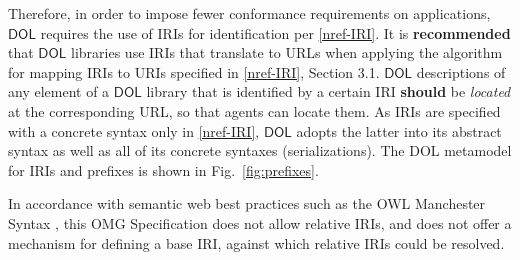 \documentclass[10pt, a4paper]{isov2}
\makeatletter
\newcommand*\CommentAuthor{}
\renewcommand*\CommentAuthor{#1}}
\newcommand*\CommentDate{}
\renewcommand*\CommentDate{#1}}
\newcommand*\CommentId{}
\renewcommand*\CommentId{#1}}
\newcommand*\CommentType{}
\renewcommand*\CommentType{#1}}
\newcommand*{\SetCommentColorByType}[1]{%
\edef\localType{{#1}}%
\expandafter\ifstrequal\localType{q-aut}{\colorlet{CommentColor}{red}}{%
\expandafter\ifstrequal\localType{q-all}{\colorlet{CommentColor}{orange}}{%
\expandafter\ifstrequal\localType{todo}{\colorlet{CommentColor}{orange}}{%
\expandafter\ifstrequal\localType{fyi}{\colorlet{CommentColor}{lightgray}}{%
\colorlet{CommentColor}{yellow}}}}}}
\newcommand*{\SetCommentPrefixByType}[1]{%
\edef\localType{{#1}}%
\expandafter\@ifmtarg\localType{%
\edef\CommentPrefix{}%
}{%
\caseupper[q]{#1}%
\edef\CommentPrefix{\thestring: }%
}}
\newcommand*{\initComment}[1]{%
\setkeys{Comment}{#1}%
\SetCommentColorByType{\CommentType}%
\relax%
\SetCommentPrefixByType{\CommentType}%
\relax%
}
\newcommand*{\todonote}[2][]{%
\initComment{#1}%
\pdfcomment[author=\CommentAuthor,color=CommentColor,date=\CommentDate,id=\CommentId]{%
\CommentPrefix
#2}}
\renewcommand*{\todonote}[2][]{%
\initComment{#1}%
\ednote{\CommentPrefix #2}}
\newcommand*{\CLnote}[2][author=Christoph Lange]{%
\todonote[author=Christoph Lange,#1]{#2}}
\newcommand*{\recommended}{\textbf{recommended}\xspace}
\newcommand*{\should}{\textbf{should}\xspace}
\newcommand*{\IS}{OMG Specification\xspace}
\newcommand*{\DOL}{\ensuremath{\mathsf{DOL}}\xspace}
\renewcommand{\noterefname}{note}
\renewcommand{\nref}[1]{\noterefname~\ref{#1}}
\renewcommand{\nref}[1]{\ref{nref-#1}}
\makeatother
\begin{document}
Therefore, in order to impose fewer conformance requirements on applications, \DOL requires the use of
 IRIs for identification per \nref{IRI}.
  It is \recommended that \DOL libraries use 
IRIs that translate to URLs when applying the algorithm for mapping IRIs to URIs specified in 
\nref{IRI}, Section 3.1.  \DOL descriptions of any element of a \DOL library that is 
identified by a certain IRI \should be \emph{located} at the corresponding URL, so that agents can 
locate them.  As IRIs are specified with a concrete syntax only in \nref{IRI}, \DOL 
adopts the latter into its abstract syntax as well as all of its concrete syntaxes 
(serializations).
The DOL metamodel for IRIs and prefixes is shown in Fig.~\ref{fig:prefixes}.




In accordance with semantic web best practices such as the OWL Manchester Syntax 
\cite{W3C:NOTE-owl2-manchester-syntax-20091027}, this \IS does not allow relative IRIs, and does 
not offer a mechanism for defining a base IRI, against which relative IRIs could be resolved.
\end{document}
